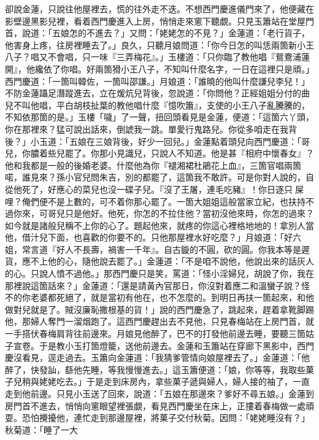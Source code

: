 卻說金蓮，只說往他屋裡去，慌的往外走不迭。不想西門慶進儀門來了，他便藏在影壁邊黑影兒裡，看着西門慶進入上房，悄悄走來窻下聽覷。{}只見玉簫站在堂屋門首，說道：「五娘怎的不進去？」又問：「姥姥怎的不見？」金蓮道：「老行貨子，他害身上疼，往房裡睡去了。」良久，只聽月娘問道：「你今日怎的叫恁兩箇新小王八子？唱又不會唱，只一味『三弄梅花』。」玉樓道：「只你臨了教他唱『鴛鴦浦蓮開』，他纔依了你唱。好兩箇猾小王八子，不知叫什麼名字，一日在這裡只是頑。」西門慶道：「一箇叫韓佐，一箇叫邵謙。」月娘道：「誰曉的他叫什麼謙兒李兒！」不防金蓮躡足潛蹤進去，立在煖炕兒背後，忽說道：「你問他？正經姐姐分付的曲兒不叫他唱，平白胡枝扯葉的教他唱什麼『憶吹簫』，支使的小王八子亂騰騰的，不知依那箇的是。」玉樓「噦」了一聲，扭回頭看見是金蓮，便道：「這箇六丫頭，你在那裡來？猛可說出話來，倒諕我一跳。{}單愛行鬼路兒。你從多咱走在我背後？」小玉道：「五娘在三娘背後，好少一回兒。」金蓮點着頭兒向西門慶道：「哥兒，你膿着些兒罷了。你那小見識兒，只說人不知道。他是甚『相府中懷春女』？他和我都是一般的後婚老婆。{}什麼他為你『褪湘裙杜鵑花上血』，三箇官唱兩箇喏，誰見來？孫小官兒問朱吉，別的都罷了，這箇我不敢許。可是你對人說的，自從他死了，好應心的菜兒也沒一碟子兒。『沒了王屠，連毛吃豬』！你日逐只𠳹屎哩？俺們便不是上數的，可不着你那心罷了。一箇大姐姐這般當家立紀，也扶持不過你來，{}可哥兒只是他好。他死，你怎的不拉住他？當初沒他來時，你怎的過來？如今就是諸般兒稱不上你的心了。題起他來，就疼的你這心裡格地地的！拿別人當他，借汁兒下面，{}也喜歡的你要不的。只他那屋裡水好吃麼？」月娘道：「好六姐，常言道『好人不長壽，禍害一千年』。{}自古鏇的不圓，砍的圓。你我本等是遲貨，應不上他的心，隨他說去罷了。」金蓮道：「不是咱不說他，他說出來的話灰人的心。只說人憤不過他。」那西門慶只是笑，罵道：「怪小淫婦兒，胡說了你，我在那裡說這箇話來？」金蓮道：「還是請黃內官那日，{}你沒對着應二和溫蠻子說？{}怪不的你老婆都死絕了，就是當初有他在，也不怎麼的。到明日再扶一箇起來，和他做對兒就是了。{}賊沒廉恥撒根基的貨！」說的西門慶急了，跳起來，趕着拿靴脚踢他，那婦人奪門一溜烟跑了。{}這西門慶趕出去不見他，只見春梅站在上房門首，就一手搭伏春梅肩背往前邊來。{}月娘見他醉了，巴不的打發他前邊去睡，要聽三箇姑子宣卷。于是教小玉打箇燈籠，送他前邊去。金蓮和玉簫站在穿廊下黑影中，西門慶沒看見，逕走過去。玉簫向金蓮道：「我猜爹管情向娘屋裡去了。」金蓮道：「他醉了，快發訕，{}繇他先睡，等我慢慢進去。」{}這玉簫便道：「娘，你等等，我取些菓子兒稍與姥姥吃去。」{}于是走到床房內，拿些菓子遞與婦人，婦人接的袖了，一直走到他前邊。只見小玉送了回來，說道：「五娘在那邊來？爹好不尋五娘。」金蓮到房門首不進去，悄悄向窻眼望裡張覷，看見西門慶坐在床上，正摟着春梅做一處頑耍。恐怕攪擾他，連忙走到那邊屋裡，將菓子交付秋菊。因問：「姥姥睡沒有？」秋菊道：「睡了一大